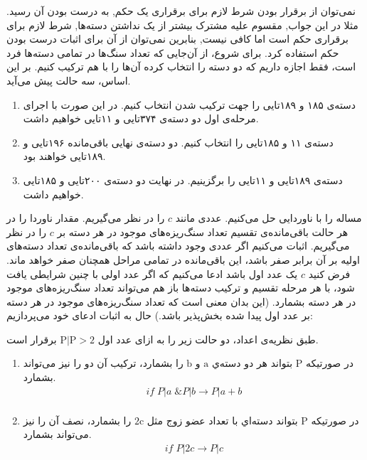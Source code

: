 \documentclass[11pt,largemargins]{h2wp}
\begin{document}
نمی‌توان از برقرار بودن شرط لازم برای برقراری یک حکم, به درست بودن آن رسید.
مثلا در این جواب, مقسوم علیه مشترک بیشتر از یک نداشتن دسته‌ها, شرط لازم برای برقراری حکم است اما کافی نیست, بنابرین نمی‌توان از آن برای اثبات درست بودن حکم استفاده کرد. 
\solution
 برای شروع، از آن‌جایی که تعداد سنگ‌ها در تمامی دسته‌ها فرد است، فقط اجازه داریم که دو دسته را انتخاب کرده آن‌ها را با هم ترکیب کنیم.
    بر این اساس، سه حالت پیش می‌آید.
    \begin{enumerate}
        \item 
        دسته‌ی ۱۸۵ و ۱۸۹تایی را جهت ترکیب شدن انتخاب کنیم. در این صورت با اجرای مرحله‌ی اول دو دسته‌ی ۳۷۴تایی و ۱۱تایی خواهیم داشت.
        \item 
        دسته‌ی ۱۱ و ۱۸۵تایی را انتخاب کنیم. دو دسته‌ی نهایی باقی‌مانده ۱۹۶تایی و ۱۸۹تایی خواهند بود.
        \item
        دسته‌ی ۱۸۹تایی و ۱۱تایی را برگزینیم. در نهایت دو دسته‌ی ۲۰۰تایی و ۱۸۵تایی خواهیم داشت.
    \end{enumerate}
    
  مساله را با ناوردایی حل می‌کنیم. عددی مانند
    $c$
    را در نظر می‌گیریم.
    مقدار ناوردا را در هر حالت باقی‌مانده‌ی تقسیم تعداد سنگ‌ریزه‌های موجود در هر دسته بر
    $c$
   را در نظر می‌گیریم.
    اثبات می‌کنیم اگر عددی وجود داشته باشد که باقی‌مانده‌ی تعداد دسته‌های اولیه بر آن برابر صفر باشد، این باقی‌مانده در تمامی مراحل همچنان صفر خواهد ماند.
    فرض کنید
    $c$ یک عدد اول باشد
    ادعا می‌کنیم که اگر عدد اولی با چنین شرایطی یافت شود، با هر مرحله تقسیم و ترکیب دسته‌ها باز هم می‌تواند تعداد سنگ‌ریزه‌های موجود در هر دسته بشمارد.
    (این بدان معنی است که تعداد سنگ‌ریزه‌های موجود در هر دسته بر عدد اول پیدا شده بخش‌پذیر باشد.)
    حال به اثبات ادعای خود می‌پردازیم:
    
    طبق نظریه‌ی اعداد، دو حالت زیر را به ازای عدد اول 
    $\mathrm{P|P>2}$
    برقرار است.
    \begin{enumerate}
        \item 
        در صورتیکه
        $\mathrm{P}$
        بتواند هر دو دسته‌ي 
        $\mathrm{a}$
        و
        $\mathrm{b}$
         را بشمارد، ترکیب آن دو را نیز می‌تواند بشمارد.
        \begin{align} 
            if\; P|a\;\& P|b \to P|a+b \\ \nonumber
        \end{align}
        \item 
        در صورتیکه
        $\mathrm{P}$
        بتواند دسته‌اي با تعداد عضو زوج مثل 
        $\mathrm{2c}$
         را بشمارد، نصف آن را نیز می‌تواند بشمارد.
        \begin{align} 
            if\;P|2c \to P|c \\ \nonumber
        \end{align}
    \end{enumerate}
    
\end{document}
